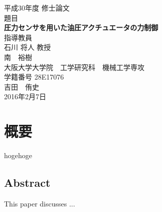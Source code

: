 \begin{titlepage}
\centering
\vspace*{40truept}
{\Large 平成30年度 修士論文} \\ %
\vspace{40truept} 
 {\Large 題目} \\
 \vspace{10truept} 
{\LARGE \textbf{圧力センサを用いた油圧アクチュエータの力制御}}\\ %
\vspace{10truept}
\vspace{120truept}
{\Large 指導教員}\\ %
 \vspace{10truept} 
{\Large 石川 将人 教授\\南　裕樹}\\ %
\vspace{60truept}
{\Large 大阪大学大学院　工学研究科　機械工学専攻}\\ %
 \vspace{10truept} 
{\Large 学籍番号 28E17076}\\ %
\vspace{20truept}
{\LARGE 吉田　侑史}\\ %
\vspace{80truept}
{\Large 2016年2月7日} %
\end{titlepage}
\cleardoublepage
\chapter*{\huge 概要}
\Cvs

hogehoge~


\section*{\huge Abstract}
\Cvs
This paper discusses ...
%
%


\newpage

\tableofcontents   %
\thispagestyle{plain}
\listoffigures %
\listoftables %

